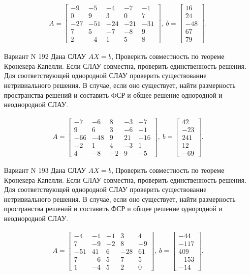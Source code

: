 \documentclass[11pt]{report}
\begin{document}
\begin{align*}
 A = \left[\begin{matrix}-9 & -5 & -4 & -7 & -1\\0 & 9 & 3 & 0 & 7\\-27 & -51 & -24 & -21 & -31\\7 & 5 & -7 & -8 & 9\\2 & -4 & 1 & 5 & 8\end{matrix}\right],
\ b = \left[\begin{matrix}16\\24\\-48\\67\\79\end{matrix}\right]. 
 \end{align*}

Вариант N 192
Дана СЛАУ $AX = b$,
Проверить совместность по теореме Кронекера-Капелли. Если СЛАУ совместна, проверить единственность решения.
Для соответствующей однородной СЛАУ проверить существование нетривиального решения. В случае, если оно существует,
найти размерность пространства решений и составить ФСР и общее решение однородной  и неоднородной СЛАУ.


\begin{align*}
 A = \left[\begin{matrix}-7 & -6 & 8 & -3 & -7\\9 & 6 & 3 & -6 & -1\\-66 & -48 & 9 & 21 & -16\\-2 & 1 & 4 & -3 & 1\\4 & -8 & -2 & 9 & -5\end{matrix}\right],
\ b = \left[\begin{matrix}42\\-23\\241\\12\\-69\end{matrix}\right]. 
 \end{align*}

Вариант N 193
Дана СЛАУ $AX = b$,
Проверить совместность по теореме Кронекера-Капелли. Если СЛАУ совместна, проверить единственность решения.
Для соответствующей однородной СЛАУ проверить существование нетривиального решения. В случае, если оно существует,
найти размерность пространства решений и составить ФСР и общее решение однородной  и неоднородной СЛАУ.


\begin{align*}
 A = \left[\begin{matrix}-4 & -1 & -1 & 3 & 4\\7 & -9 & -2 & 8 & -9\\-51 & 41 & 6 & -28 & 61\\7 & -6 & 5 & 7 & 5\\1 & -4 & 5 & 2 & 0\end{matrix}\right],
\ b = \left[\begin{matrix}-44\\-117\\409\\-153\\-14\end{matrix}\right]. 
 \end{align*}
\end{document}
